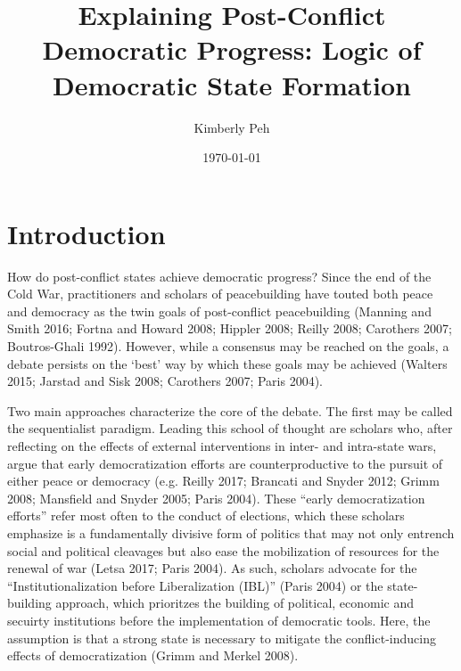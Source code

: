 \documentclass [11pt]{article}
\title{Explaining Post-Conflict Democratic Progress: Logic of Democratic State Formation}
\author{Kimberly Peh}
\date{\today}
\begin{document}
\maketitle

\section*{Introduction} 

How do post-conflict states achieve democratic progress? Since the end of the Cold War, practitioners and scholars of peacebuilding have touted both peace and democracy as the twin goals of post-conflict peacebuilding (Manning and Smith 2016; Fortna and Howard 2008; Hippler 2008; Reilly 2008; Carothers 2007; Boutros-Ghali 1992). However, while a consensus may be reached on the goals, a debate persists on the `best' way by which these goals may be achieved (Walters 2015; Jarstad and Sisk 2008; Carothers 2007; Paris 2004).

Two main approaches characterize the core of the debate. The first may be called the sequentialist paradigm. Leading this school of thought are scholars who, after reflecting on the effects of external interventions in inter- and intra-state wars, argue that early democratization efforts are counterproductive to the pursuit of either peace or democracy (e.g. Reilly 2017; Brancati and Snyder 2012; Grimm 2008; Mansfield and Snyder 2005; Paris 2004). These ``early democratization efforts'' refer most often to the conduct of elections, which these scholars emphasize is a fundamentally divisive form of politics that may not only entrench social and political cleavages but also ease the mobilization of resources for the renewal of war (Letsa 2017; Paris 2004). As such, scholars advocate for the ``Institutionalization before Liberalization (IBL)'' (Paris 2004) or the state-building approach, which prioritzes the building of political, economic and secuirty institutions before the implementation of democratic tools. Here, the assumption is that a strong state is necessary to mitigate the conflict-inducing effects of democratization (Grimm and Merkel 2008).
\end{document}
